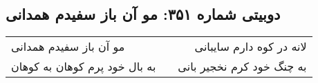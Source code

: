 \begin{center}
\section*{دوبیتی شماره ۳۵۱: مو آن باز سفیدم همدانی}
\label{sec:351}
\begin{longtable}{l p{0.5cm} r}
مو آن باز سفیدم همدانی
&&
لانه در کوه دارم سایبانی
\\
به بال خود پرم کوهان به کوهان
&&
به چنگ خود کرم نخجیر بانی
\\
\end{longtable}
\end{center}
